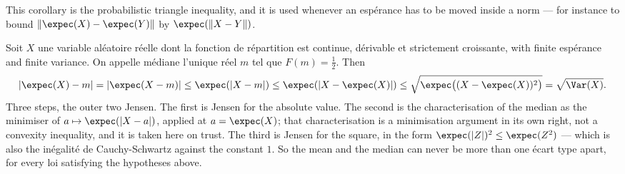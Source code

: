 This corollary is the probabilistic triangle inequality, and it is used whenever
an espérance has to be moved inside a norm --- for instance to bound
$\|\expec(X) - \expec(Y)\|$ by $\expec(\|X-Y\|)$.

\begin{example}
  Soit $X$ une variable aléatoire réelle dont la fonction de répartition est
  continue, dérivable et strictement croissante, with finite espérance and finite
  variance. On appelle médiane l'unique réel $m$ tel que $F(m) = \tfrac12$. Then
  \[
    |\expec(X) - m| = |\expec(X-m)| \leq \expec(|X-m|) \leq \expec(|X - \expec(X)|)
      \leq \sqrt{\expec\big((X-\expec(X))^{2}\big)} = \sqrt{\Var(X)} .
  \]
  Three steps, the outer two Jensen. The first is Jensen for the absolute value.
  The second is the characterisation of the median as the minimiser of
  $a \mapsto \expec(|X-a|)$, applied at $a = \expec(X)$; that characterisation is
  a minimisation argument in its own right, not a convexity inequality, and it is
  taken here on trust. The third is Jensen for the square, in the form
  $\expec(|Z|)^{2} \leq \expec(Z^{2})$ --- which is also the inégalité de
  Cauchy-Schwartz against the constant $1$. So the mean and the median can never
  be more than one écart type apart, for every loi satisfying the hypotheses
  above.
\end{example}

